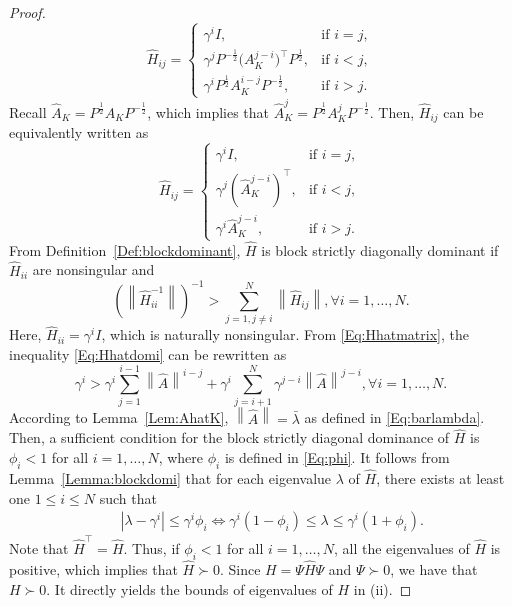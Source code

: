 \documentclass[letterpaper, 10 pt, conference]{ieeeconf}  %
\begin{document}
\begin{proof}
\begin{equation}
\hat{H}_{ij} =
\begin{cases}
\gamma^i I, & \text{if } i = j,\\[6pt]
\gamma^j P^{-\frac{1}{2}} \bigl(A_K^{j-i}\bigr)^\top P^{\frac{1}{2}}, & \text{if } i < j,\\[6pt]
\gamma^i P^{\frac{1}{2}} A_K^{i-j}P^{-\frac{1}{2}}, & \text{if } i > j.
\end{cases}
\end{equation}
Recall  $\hat{A}_{K}=P^{\frac{1}{2}} A_K P^{-\frac{1}{2}}$, which implies that $\hat{A}^j_{K}=P^{\frac{1}{2}} A^j_K P^{-\frac{1}{2}}$. Then, $\hat{H}_{ij}$ can be equivalently written as \begin{equation}\label{Eq:Hhatmatrix}
\hat{H}_{ij} =
\begin{cases}
\gamma^i I, & \text{if } i = j,\\[6pt]
\gamma^j (\hat{A}_{K}^{j-i})^\top, & \text{if } i < j,\\[6pt]
\gamma^i \hat{A}_{K}^{j-i}, & \text{if } i > j.
\end{cases}
\end{equation}
From Definition~\ref{Def:blockdominant},  $\hat{H}$ is block strictly diagonally dominant if $\hat{H}_{ii}$ are nonsingular and 
     \begin{equation}\label{Eq:Hhatdomi}
      \left(\left\| \hat{H}^{-1}_{ii}\right\|\right)^{-1} > \sum_{j=1,j\neq i}^{N}\left\| \hat{H}_{ij}\right\|, \forall i=1,\ldots, N.\end{equation}
Here, $\hat{H}_{ii}=\gamma^i I$, which is naturally nonsingular. From \eqref{Eq:Hhatmatrix}, the inequality  \eqref{Eq:Hhatdomi} can be rewritten as 
\begin{equation}\label{Eq:Hhatdomi2}
 \gamma^i > \gamma^i \sum_{j=1}^{i-1}\left\| \hat{A}\right\|^{i-j} \!+\gamma^i \sum_{j=i+1}^{N}\gamma^{j-i}\left\|\hat{A}\right\|^{j-i}, \forall i=1,\ldots, N.
      \end{equation}
According to Lemma~\ref{Lem:AhatK}, $\left\| \hat{A}\right\|=\bar{\lambda}$ as defined in \eqref{Eq:barlambda}. Then, a sufficient condition for the block strictly diagonal dominance of $\hat{H}$ is 
$\phi_i<1$ for all $i=1,\ldots, N$, where $\phi_i$ is defined in \eqref{Eq:phi}. It follows from Lemma~\ref{Lemma:blockdomi} that for each  eigenvalue $\lambda$ of $\hat{H}$, there exists at least one $1\leq i\leq N$ such that 
     \begin{eqnarray*}
         && |\lambda-\gamma^i|\leq   \gamma^i \phi_i \Leftrightarrow  \gamma^i (1-\phi_i) \leq \lambda\leq \gamma^i (1+\phi_i). 
 \end{eqnarray*}
Note that $\hat{H}^{\top}=\hat{H}$.  Thus,  if $\phi_i<1$ for all $i=1,\ldots,N$,  all the eigenvalues of $\hat{H}$ is positive, which implies that $\hat{H}\succ 0$. Since $H=\Psi \hat{H}\Psi$ and $\Psi \succ 0$, we have that $H\succ 0$. It directly yields the bounds of eigenvalues of $H$ in (ii). 
\end{proof}
\end{document}
